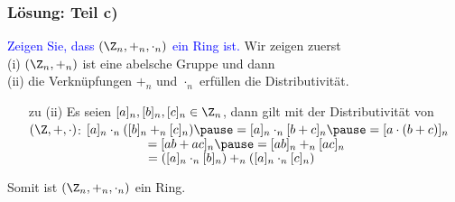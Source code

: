 %
%
\begin{frame}\frametitle{Lösung: Teil c)}
%
\textcolor{blue}{Zeigen Sie, dass $(\Z_n,+_n,\cdot_n)$ ein Ring ist.}
%
\vfill
Wir zeigen zuerst \\
(i) $(\Z_n,+_n)$ ist eine abelsche Gruppe und dann \\
(ii) die Verkn\"upfungen $+_n$ und $\cdot_n$ erf\"ullen die Distributivit\"at.
\vfill
\begin{itemize}
\item[zu (ii)]
Es seien $[a]_n,[b]_n,[c]_n \in \Z_n$, dann gilt mit der Distributivit\"at von $(\Z,+,\cdot)$:\pause
\vfill
$
[a]_n \cdot_n ([b]_n +_n [c]_n)\pause=[a]_n\cdot_n [b+c]_n\pause=[a\cdot (b+c)]_n$\\\pause
$\hspace{33mm}=[ab+ac]_n\pause=[ab]_n+_n[ac]_n$\\\pause
$\hspace{33mm}=([a]_n\cdot_n[b]_n) +_n ([a]_n\cdot_n[c]_n)
$
\vfill
\end{itemize}\pause
\vfill
Somit ist $(\Z_n,+_n,\cdot_n)$ ein Ring.

\end{frame}

